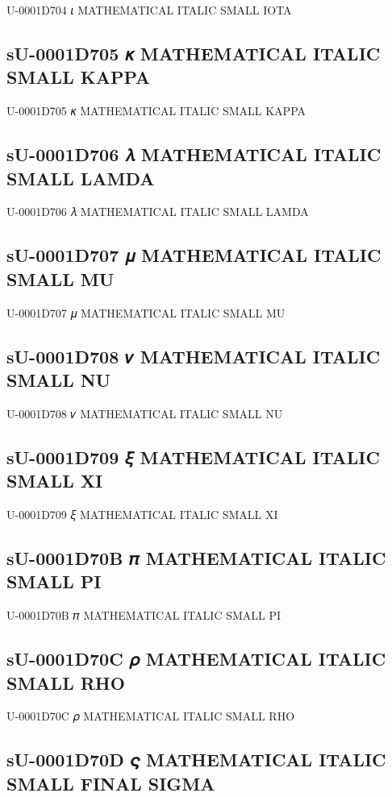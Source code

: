 U-0001D704 𝜄 MATHEMATICAL ITALIC SMALL IOTA

\subsection{sU-0001D705 𝜅 MATHEMATICAL ITALIC SMALL KAPPA}

U-0001D705 𝜅 MATHEMATICAL ITALIC SMALL KAPPA

\subsection{sU-0001D706 𝜆 MATHEMATICAL ITALIC SMALL LAMDA}

U-0001D706 𝜆 MATHEMATICAL ITALIC SMALL LAMDA

\subsection{sU-0001D707 𝜇 MATHEMATICAL ITALIC SMALL MU}

U-0001D707 𝜇 MATHEMATICAL ITALIC SMALL MU

\subsection{sU-0001D708 𝜈 MATHEMATICAL ITALIC SMALL NU}

U-0001D708 𝜈 MATHEMATICAL ITALIC SMALL NU

\subsection{sU-0001D709 𝜉 MATHEMATICAL ITALIC SMALL XI}

U-0001D709 𝜉 MATHEMATICAL ITALIC SMALL XI

\subsection{sU-0001D70B 𝜋 MATHEMATICAL ITALIC SMALL PI}

U-0001D70B 𝜋 MATHEMATICAL ITALIC SMALL PI

\subsection{sU-0001D70C 𝜌 MATHEMATICAL ITALIC SMALL RHO}

U-0001D70C 𝜌 MATHEMATICAL ITALIC SMALL RHO

\subsection{sU-0001D70D 𝜍 MATHEMATICAL ITALIC SMALL FINAL SIGMA}

